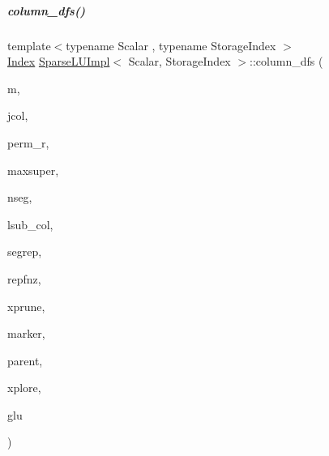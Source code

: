 \mbox{\label{group___sparse_l_u___module_a6f543ae02eb6467e9bcc1e5cec8ccdd2}} 
\subparagraph{\texorpdfstring{column\+\_\+dfs()}{column\_dfs()}}
{\footnotesize\ttfamily template$<$typename Scalar , typename Storage\+Index $>$ \\
\hyperlink{namespace_eigen_a62e77e0933482dafde8fe197d9a2cfde}{Index} \hyperlink{group___sparse_l_u___module_class_eigen_1_1internal_1_1_sparse_l_u_impl}{Sparse\+L\+U\+Impl}$<$ Scalar, Storage\+Index $>$\+::column\+\_\+dfs (\begin{DoxyParamCaption}\item[{const \hyperlink{namespace_eigen_a62e77e0933482dafde8fe197d9a2cfde}{Index}}]{m,  }\item[{const \hyperlink{namespace_eigen_a62e77e0933482dafde8fe197d9a2cfde}{Index}}]{jcol,  }\item[{\hyperlink{group___core___module}{Index\+Vector} \&}]{perm\+\_\+r,  }\item[{\hyperlink{namespace_eigen_a62e77e0933482dafde8fe197d9a2cfde}{Index}}]{maxsuper,  }\item[{\hyperlink{namespace_eigen_a62e77e0933482dafde8fe197d9a2cfde}{Index} \&}]{nseg,  }\item[{\hyperlink{group___core___module_class_eigen_1_1_ref}{Block\+Index\+Vector}}]{lsub\+\_\+col,  }\item[{\hyperlink{group___core___module}{Index\+Vector} \&}]{segrep,  }\item[{\hyperlink{group___core___module_class_eigen_1_1_ref}{Block\+Index\+Vector}}]{repfnz,  }\item[{\hyperlink{group___core___module}{Index\+Vector} \&}]{xprune,  }\item[{\hyperlink{group___core___module}{Index\+Vector} \&}]{marker,  }\item[{\hyperlink{group___core___module}{Index\+Vector} \&}]{parent,  }\item[{\hyperlink{group___core___module}{Index\+Vector} \&}]{xplore,  }\item[{\hyperlink{struct_eigen_1_1internal_1_1_l_u___global_l_u__t}{Global\+L\+U\+\_\+t} \&}]{glu }\end{DoxyParamCaption})\hspace{0.3cm}{\ttfamily [protected]}}



